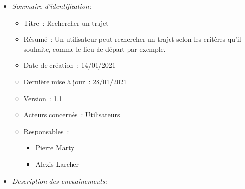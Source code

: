 \begin{itemize}

\item \textit{Sommaire d'identification:}

\begin{itemize}

\item Titre~: Rechercher un trajet

\item Résumé~: Un utilisateur peut rechercher un trajet selon les critères qu'il souhaite, comme le lieu de départ par exemple.

\item Date de création~: 14/01/2021

\item Dernière mise à jour~: 28/01/2021

\item Version~: 1.1

\item Acteurs concernés~: Utilisateurs

\item Responsables~:
\begin{itemize}
            \item Pierre Marty
            \item Alexis Larcher
        \end{itemize}

\end{itemize}

\item \textit{Description des enchaînements:}


\end{itemize}
